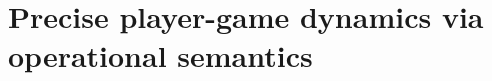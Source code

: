 \newcommand{\Player}[4]{\ensuremath{{#1}{:}\left<{#2},{#3},{#4}\right>}}
\newcommand{\PropIsTrue}[2]{\ensuremath{#1 \vdash #2~\textsf{true}}}
\newcommand{\StepsTo}[4]{\ensuremath{\left<{#1};{#2}\right> \longrightarrow \left<{#3};{#4}\right>}}

\section{Precise player-game dynamics via operational semantics}
\label{sec:opsem}




